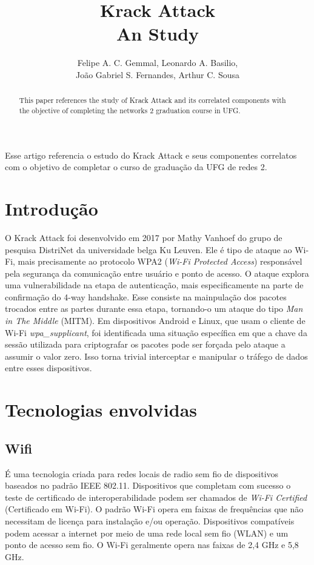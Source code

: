 \documentclass[12pt]{article}
\title{Krack Attack \\ An Study}
\author{Felipe A. C. Gemmal\inst{1}, Leonardo A. Basilio\inst{1},\\ João Gabriel S. Fernandes\inst{1}, Arthur C. Sousa\inst{1} }
\begin{document}
 

\maketitle

\begin{abstract}
	This paper references the study of Krack Attack and its correlated components with the objective of completing the networks 2 graduation course in UFG.
\end{abstract}

\begin{resumo} 
	Esse artigo referencia o estudo do Krack Attack e seus componentes correlatos com o objetivo de completar o curso de graduação da UFG de redes 2.
\end{resumo}


\section{Introdução}
	O Krack Attack \cite{vanhoef:2017} foi desenvolvido em 2017 por Mathy Vanhoef do grupo de pesquisa DistriNet da universidade belga Ku Leuven. Ele é tipo de ataque ao Wi-Fi, mais precisamente ao protocolo WPA2 (\textit{Wi-Fi Protected Access}) responsável pela segurança da comunicação entre usuário e ponto de acesso. O ataque explora uma vulnerabilidade na etapa de autenticação, mais especificamente na parte de  confirmação do 4-way handshake. Esse consiste na mainpulação dos pacotes trocados entre as partes durante essa etapa, tornando-o um ataque do tipo \textit{Man in The Middle} (MITM).
	Em dispositivos Android e Linux, que usam o cliente de Wi-Fi \textit{wpa\_supplicant}, foi identificada uma situação específica em que a chave da sessão utilizada para criptografar os pacotes pode ser forçada pelo ataque a assumir o valor zero. Isso torna trivial interceptar e manipular o tráfego de dados entre esses dispositivos.

\section{Tecnologias envolvidas}
\subsection{Wifi}
É uma tecnologia criada para redes locais de radio sem fio de dispositivos baseados no padrão IEEE 802.11. Dispositivos que completam com sucesso o teste de certificado de interoperabilidade podem ser chamados de \textit{Wi-Fi Certified} (Certificado em Wi-Fi). O padrão Wi-Fi opera em faixas de frequências que não necessitam de licença para instalação e/ou operação. Dispositivos compatíveis podem acessar a internet por meio de uma rede local sem fio (WLAN) e um ponto de acesso sem fio. O Wi-Fi geralmente opera nas faixas de 2,4 GHz e 5,8 GHz.
\end{document}
